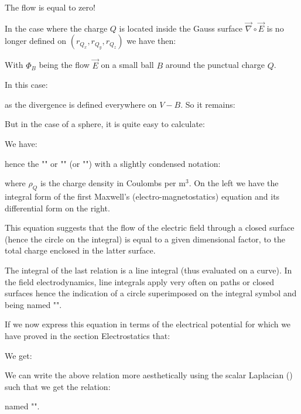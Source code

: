 	The flow is equal to zero!
	
	In the case where the charge $Q$ is located inside the Gauss surface $\vec{\nabla}\circ\vec{E}$ is no longer defined on $(r_{Q_x},r_{Q_y},r_{Q_z})$ we have then:
	
	With $\Phi_B$ being the flow $\vec{E}$ on a small ball  $B$ around the punctual charge $Q$.
	
	In this case:
	
	as the divergence is defined everywhere on $V-B$. So it remains:
	
	But in the case of a sphere, it is quite easy to calculate:
	
	We have:
	
	hence the "" or "\label{gauss law}" (or "") with a slightly condensed notation:
	
	where $\rho_Q$ is the charge density in Coulombs per $\text{m}^3$. On the left we have the integral form of the first Maxwell's (electro-magnetostatics) equation and its differential form on the right.
	
	This equation suggests that the flow of the electric field through a closed surface (hence the circle on the integral) is equal to a given dimensional factor, to the total charge enclosed in the latter surface.
	\begin{tcolorbox}[title=Remark,colframe=black,arc=10pt]
	The integral of the last relation is a line integral (thus evaluated on a curve). In the field electrodynamics, line integrals  apply very often on paths or closed surfaces hence the indication of a circle superimposed on the integral symbol and being named "".
	\end{tcolorbox}	
	If we now express this equation in terms of the electrical potential for which we have proved in the section Electrostatics that:
	
	We get:
	
	We can write the above relation more aesthetically using the scalar Laplacian () such that we get the relation:
	
	named "\label{maxwell-poisson equation}".
	
